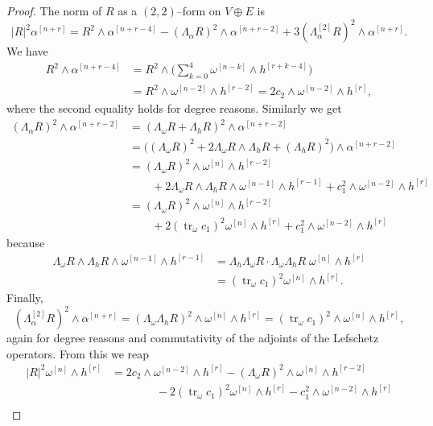 \documentclass[11pt,a4paper]{amsart}
\def\^#1{^{[#1]}}
\DeclareMathOperator{\tr}{tr}
\theoremstyle{definition}
\theoremstyle{remark}
\numberwithin{equation}{section}
\begin{document}
\begin{proof}
The norm of $R$ as a $(2,2)$--form on $V \oplus E$ is
$$
|R|^2 \alpha\^{n+r}
= R^2 \wedge \alpha\^{n+r-4}
- (\Lambda_\alpha R)^2 \wedge \alpha\^{n+r-2}
+ 3 (\Lambda\^{2}_\alpha R)^2 \wedge \alpha\^{n+r}.
$$
We have
\begin{align*}
R^2 \wedge \alpha\^{n+r-4}
&= R^2 \wedge \biggl(\sum_{k=0}^4\omega\^{n-k} \wedge h\^{r+k-4}\biggr)
\\
&= R^2 \wedge \omega\^{n-2} \wedge h\^{r-2}
= 2 c_2 \wedge \omega\^{n-2} \wedge h\^{r},
\end{align*}
where the second equality holds for degree reasons. Similarly we get
\begin{align*}
(\Lambda_\alpha R)^2 \wedge \alpha\^{n+r-2}
&= (\Lambda_\omega R + \Lambda_h R)^2 \wedge \alpha\^{n+r-2}
\\
&= \bigl( (\Lambda_\omega R)^2 + 2 \Lambda_\omega R \wedge \Lambda_h R 
+ (\Lambda_h R)^2 \bigr) 
\wedge \alpha\^{n+r-2}
\\
&= (\Lambda_\omega R)^2 \wedge \omega\^{n} \wedge h\^{r-2} 
\\
&\qquad
+ 2 \Lambda_\omega R \wedge \Lambda_h R \wedge \omega\^{n-1} \wedge h\^{r-1}
+ c_1^2 \wedge \omega\^{n-2} \wedge h\^{r} 
\\
&= (\Lambda_\omega R)^2 \wedge \omega\^{n} \wedge h\^{r-2} 
\\
&\qquad
+ 2 (\tr_\omega c_1)^2 \omega\^{n} \wedge h\^{r}
+ c_1^2 \wedge \omega\^{n-2} \wedge h\^{r} 
\end{align*}
because 
\begin{align*}
\Lambda_\omega R \wedge \Lambda_h R \wedge \omega\^{n-1} \wedge h\^{r-1}
&= \Lambda_h \Lambda_\omega R \cdot \Lambda_\omega \Lambda_h R \;
\omega\^{n} \wedge h\^{r}
\\
&= (\tr_\omega c_1)^2 \omega\^{n} \wedge h\^{r}.
\end{align*}
Finally, 
$$
(\Lambda\^{2}_\alpha R)^2 \wedge \alpha\^{n+r} 
= (\Lambda_\omega \Lambda_h R)^2 \wedge \omega\^{n} \wedge h\^{r}
= (\tr_\omega c_1)^2 \wedge \omega\^{n} \wedge h\^{r},
$$
again for degree reasons and commutativity of the adjoints of the Lefschetz
operators. From this we reap
\begin{align*}
    \lvert R \rvert^2 \omega\^{n} \wedge h\^{r}
    &= 2 c_2 \wedge \omega\^{n-2} \wedge h\^{r}
    - (\Lambda_\omega R)^2 \wedge \omega\^{n} \wedge h\^{r-2} 
    \\
    &\qquad\qquad
    {}- 2 (\tr_\omega c_1)^2 \omega\^{n} \wedge h\^{r}
    - c_1^2 \wedge \omega\^{n-2} \wedge h\^{r} 
    \\

\end{align*}
\end{proof}
\end{document}
